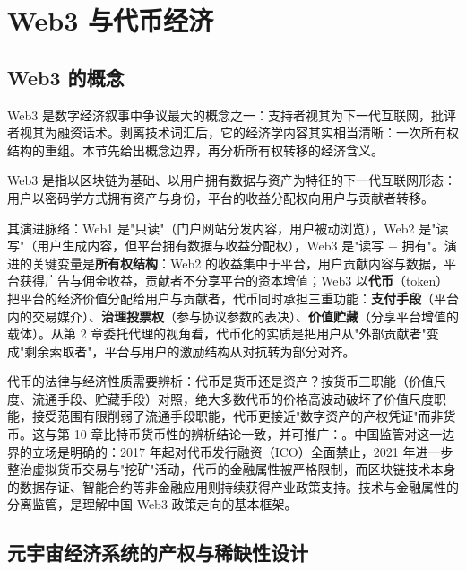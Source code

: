 \section{Web3 与代币经济}

\subsection{Web3 的概念}

Web3 是数字经济叙事中争议最大的概念之一：支持者视其为下一代互联网，批评者视其为融资话术。剥离技术词汇后，它的经济学内容其实相当清晰：一次所有权结构的重组。本节先给出概念边界，再分析所有权转移的经济含义。

\begin{definition}[Web3]
Web3 是指以区块链为基础、以用户拥有数据与资产为特征的下一代互联网形态：用户以密码学方式拥有资产与身份，平台的收益分配权向用户与贡献者转移。
\end{definition}

其演进脉络：Web1 是"只读"（门户网站分发内容，用户被动浏览），Web2 是"读写"（用户生成内容，但平台拥有数据与收益分配权），Web3 是"读写 + 拥有"。演进的关键变量是\textbf{所有权结构}：Web2 的收益集中于平台，用户贡献内容与数据，平台获得广告与佣金收益，贡献者不分享平台的资本增值；Web3 以\textbf{代币}（token）把平台的经济价值分配给用户与贡献者，代币同时承担三重功能：\textbf{支付手段}（平台内的交易媒介）、\textbf{治理投票权}（参与协议参数的表决）、\textbf{价值贮藏}（分享平台增值的载体）。从第 2 章委托代理的视角看，代币化的实质是把用户从"外部贡献者"变成"剩余索取者"，平台与用户的激励结构从对抗转为部分对齐。

代币的法律与经济性质需要辨析：代币是货币还是资产？按货币三职能（价值尺度、流通手段、贮藏手段）对照，绝大多数代币的价格高波动破坏了价值尺度职能，接受范围有限削弱了流通手段职能，代币更接近"数字资产的产权凭证"而非货币。这与第 10 章比特币货币性的辨析结论一致，并可推广：。中国监管对这一边界的立场是明确的：2017 年起对代币发行融资（ICO）全面禁止，2021 年进一步整治虚拟货币交易与"挖矿"活动，代币的金融属性被严格限制，而区块链技术本身的数据存证、智能合约等非金融应用则持续获得产业政策支持。技术与金融属性的分离监管，是理解中国 Web3 政策走向的基本框架。

\subsection{元宇宙经济系统的产权与稀缺性设计}

